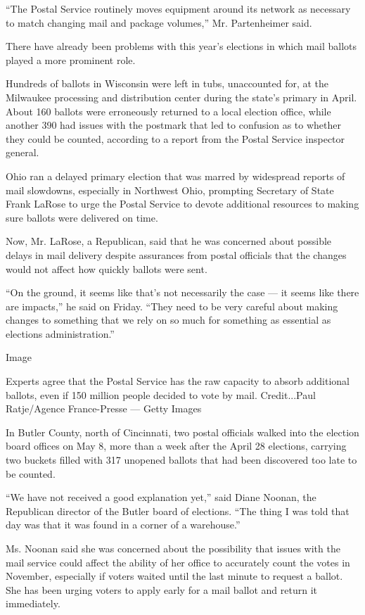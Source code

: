 ``The Postal Service routinely moves equipment around its network as
necessary to match changing mail and package volumes,'' Mr. Partenheimer
said.

There have already been problems with this year's elections in which
mail ballots played a more prominent role.

Hundreds of ballots in Wisconsin were left in tubs, unaccounted for, at
the Milwaukee processing and distribution center during the state's
primary in April. About 160 ballots were erroneously returned to a local
election office, while another 390 had issues with the postmark that led
to confusion as to whether they could be counted, according to a report
from the Postal Service inspector general.

Ohio ran a delayed primary election that was marred by widespread
reports of mail slowdowns, especially in Northwest Ohio, prompting
Secretary of State Frank LaRose to urge the Postal Service to devote
additional resources to making sure ballots were delivered on time.

Now, Mr. LaRose, a Republican, said that he was concerned about possible
delays in mail delivery despite assurances from postal officials that
the changes would not affect how quickly ballots were sent.

``On the ground, it seems like that's not necessarily the case --- it
seems like there are impacts,'' he said on Friday. ``They need to be
very careful about making changes to something that we rely on so much
for something as essential as elections administration.''

Image

Experts agree that the Postal Service has the raw capacity to absorb
additional ballots, even if 150 million people decided to vote by mail.
Credit...Paul Ratje/Agence France-Presse --- Getty Images

In Butler County, north of Cincinnati, two postal officials walked into
the election board offices on May 8, more than a week after the April 28
elections, carrying two buckets filled with 317 unopened ballots that
had been discovered too late to be counted.

``We have not received a good explanation yet,'' said Diane Noonan, the
Republican director of the Butler board of elections. ``The thing I was
told that day was that it was found in a corner of a warehouse.''

Ms. Noonan said she was concerned about the possibility that issues with
the mail service could affect the ability of her office to accurately
count the votes in November, especially if voters waited until the last
minute to request a ballot. She has been urging voters to apply early
for a mail ballot and return it immediately.

